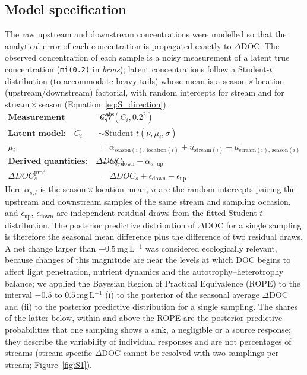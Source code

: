 \documentclass[11pt,a4paper]{article}
\begin{document}
\subsection{Model specification}
The raw upstream and downstream concentrations were modelled so that the analytical error of each concentration is propagated exactly to $\Delta$DOC. The observed concentration of each sample is a noisy measurement of a latent true concentration (\texttt{mi(0.2)} in \emph{brms}); latent concentrations follow a Student-$t$ distribution (to accommodate heavy tails) whose mean is a season\,$\times$\,location (upstream/downstream) factorial, with random intercepts for stream and for stream\,$\times$\,season (Equation~\ref{eq:S_direction}).
\begin{equation}
\begin{aligned}
\textbf{Measurement model:} \quad
C_i^{\text{obs}} &\sim \mathcal{N}(C_i, 0.2^2) \\[0.5em]
\textbf{Latent model:} \quad
C_i &\sim \text{Student-}t(\nu, \mu_i, \sigma) \\
\mu_i &= \alpha_{\text{season}(i),\,\text{location}(i)} + u_{\text{stream}(i)} + u_{\text{stream}(i),\,\text{season}(i)} \\[0.5em]
\textbf{Derived quantities:} \quad
\Delta DOC_s &= \alpha_{s,\,\text{down}} - \alpha_{s,\,\text{up}} \\
\Delta DOC_s^{\text{pred}} &= \Delta DOC_s + \epsilon_{\text{down}} - \epsilon_{\text{up}}
\end{aligned}
\label{eq:S_direction}
\end{equation}
Here $\alpha_{s,l}$ is the season\,$\times$\,location mean, $u$ are the random intercepts pairing the upstream and downstream samples of the same stream and sampling occasion, and $\epsilon_{\text{up}}$, $\epsilon_{\text{down}}$ are independent residual draws from the fitted Student-$t$ distribution. The posterior predictive distribution of $\Delta$DOC for a single sampling is therefore the seasonal mean difference plus the difference of two residual draws. A net change larger than $\pm0.5$\,mg\,L$^{-1}$ was considered ecologically relevant, because changes of this magnitude are near the levels at which DOC begins to affect light penetration, nutrient dynamics and the autotrophy--heterotrophy balance; we applied the Bayesian Region of Practical Equivalence (ROPE) to the interval $-0.5$ to $0.5$\,mg\,L$^{-1}$ (i) to the posterior of the seasonal average $\Delta$DOC and (ii) to the posterior predictive distribution for a single sampling. The shares of the latter below, within and above the ROPE are the posterior predictive probabilities that one sampling shows a sink, a negligible or a source response; they describe the variability of individual responses and are not percentages of streams (stream-specific $\Delta$DOC cannot be resolved with two samplings per stream; Figure~\ref{fig:S1}).
\end{document}
